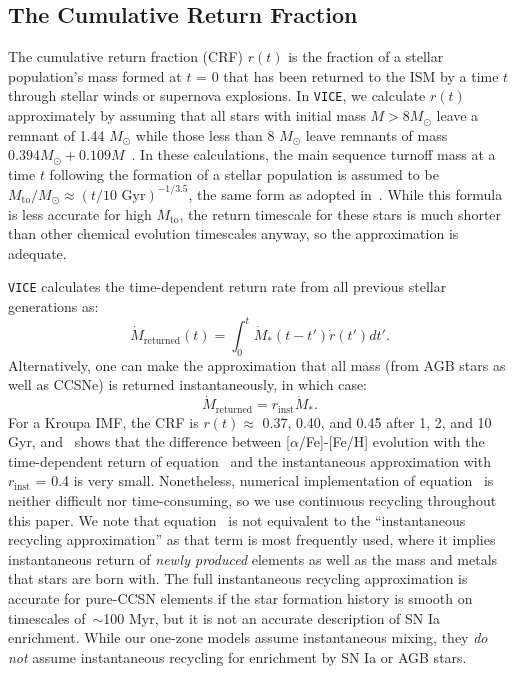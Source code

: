 \subsection{The Cumulative Return Fraction} 
\label{bursts:sec:crf} 
The cumulative return fraction (CRF) $r(t)$ is the fraction of a stellar 
population's mass formed at $t$ = 0 that has been returned to the ISM by a 
time $t$ through stellar winds or supernova explosions. In \texttt{VICE}, we 
calculate $r(t)$ approximately by assuming that all stars with initial mass 
$M > 8 M_\odot$ leave a remnant of 1.44 $M_\odot$ while those less than 8 
$M_\odot$ leave remnants of mass $0.394 M_\odot + 0.109 M$~\citep{Kalirai2008}. 
In these calculations, the main sequence turnoff mass at a time $t$ following 
the formation of a stellar population is assumed to be $M_\text{to}/M_\odot 
\approx (t/\text{10 Gyr})^{-1/3.5}$, the same form as adopted 
in~\citet{Weinberg2017b}. While this formula is less accurate for high 
$M_\text{to}$, the return timescale for these stars is much shorter than 
other chemical evolution timescales anyway, so the approximation is adequate. 
\par
\texttt{VICE} calculates the time-dependent return rate from all previous 
stellar generations as: 
\begin{equation}
\label{bursts:eq:mdot_returned} 
\dot{M}_\text{returned}(t) = \int_0^t\dot{M}_*(t - t')\dot{r}(t')dt' . 
\end{equation} 
Alternatively, one can make the approximation that all mass (from AGB stars as 
well as CCSNe) is returned instantaneously, in which case: 
\begin{equation} 
\label{bursts:eq:mdot_returned_inst}
\dot{M}_\text{returned} = r_\text{inst}\dot{M}_* . 
\end{equation}
For a Kroupa IMF, the CRF is $r(t) \approx$ 0.37, 0.40, and 0.45 after 1, 2, 
and 10 Gyr, and~\citet{Weinberg2017b} shows that the difference between 
[$\alpha$/Fe]-[Fe/H] evolution with the time-dependent return of 
equation~ and the instantaneous approximation with 
$r_\text{inst}$ = 0.4 is very small. Nonetheless, numerical implementation of 
equation~ is neither difficult nor time-consuming, so we 
use continuous recycling throughout this paper. We note that 
equation~ is not equivalent to the ``instantaneous 
recycling approximation'' as that term is most frequently used, where it 
implies instantaneous return of \textit{newly produced} elements as well as the 
mass and metals that stars are born with. The full instantaneous recycling 
approximation is accurate for pure-CCSN elements if the star formation 
history is smooth on timescales of~$\sim$100 Myr, but it is not an accurate 
description of SN Ia enrichment. 
While our one-zone models assume instantaneous mixing,
they {\it do not} assume instantaneous recycling for enrichment 
by SN Ia or AGB stars.

